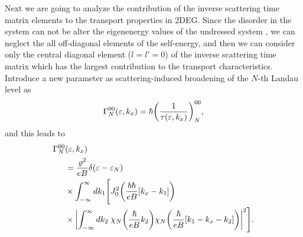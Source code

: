 Next we are going to analyze the contribution of the inverse scattering time matrix elements to the transport properties in 2DEG.
Since the disorder in the system can not be alter the eigenenergy values of the undressed system \cite{wackerl20}, we can neglect the all off-diagonal elements of the self-energy, and then we can consider only the central diagonal element (${l=l'=0}$) of the inverse scattering time matrix which has the largest contribution to the transport characteristics.
Introduce a new parameter as scattering-induced broadening of the $N$-th Landau level as \cite{dini16,endo09}
\begin{equation} \label{eq_14}
 \Gamma^{00}_{N}(\varepsilon,k_x) = \hbar \qty(\frac{1}{\tau(\varepsilon,k_x)})^{00}_{N},
\end{equation}
and this leads to
\begin{equation} \label{eq_15}
 \begin{aligned}
   \Gamma^{00}_{N}& (\varepsilon,k_x) \\
   & =
   \frac { \varrho^2}{eB}
   \delta(\varepsilon - \varepsilon_{N}) \\
   & \times
   \int_{-\infty}^{\infty} d k_1 \Bigg[
   J_0^2\qty(\frac{b\hbar}{eB}[{k}_x - k_1])
   \\
   & \times
   \qty|
   \int_{-\infty}^{\infty} dk_2 \;
   {\chi}_{N}\qty(\frac{\hbar}{eB}k_2)
   {\chi}_{N}\qty(\frac{\hbar}{eB} \qty[k_1 - {k}_x - k_2])|^2\Bigg].
 \end{aligned}
\end{equation}

